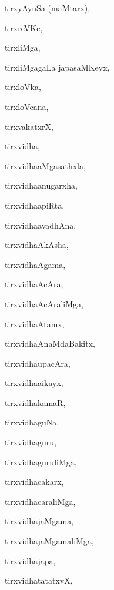 \begin{multicols}{2}
{tirxyAyuSa (maMtarx)}, \pageref{tirxyAyuSa maMtarx}

{tirxreVKe}, \pageref{tirxreVKe}

{tirxliMga}, \pageref{tirxliMga}

{tirxliMgagaLa japasaMKeyx}, \pageref{tirxliMgagaLa japasaMKeyx}

{tirxloVka}, \pageref{tirxloVka}

{tirxloVcana}, \pageref{tirxloVcana}

{tirxvakatxrX}, \pageref{tirxvakatxrX}

{tirxvidha}, \pageref{tirxvidha}

{tirxvi{dha}aMgasathxla}, \pageref{tirxvidhaaMgasathxla}

{tirxvi{dha}anugarxha}, \pageref{tirxvidhaanugarxha}

{tirxvi{dha}apiRta}, \pageref{tirxvidhaapiRta}

{tirxvi{dha}avadhAna}, \pageref{tirxvidhaavadhAna}

{tirxvi{dha}AkAsha}, \pageref{tirxvidhaAkAsha}

{tirxvi{dha}Agama}, \pageref{tirxvidhaAgama}

{tirxvi{dha}AcAra}, \pageref{tirxvidhaAcAra}

{tirxvi{dha}AcAraliMga}, \pageref{tirxvidhaAcAraliMga}

{tirxvi{dha}Atamx}, \pageref{tirxvidhaAtamx}

{tirxvi{dha}AnaMdaBakitx}, \pageref{tirxvidhaAnaMdaBakitx}

{tirxvi{dha}upacAra}, \pageref{tirxvidhaupacAra}

{tirxvi{dha}aikayx}, \pageref{tirxvidhaaikayx}

{tirxvidhakamaR}, \pageref{tirxvidhakamaR}

{tirxvidhaguNa}, \pageref{tirxvidhaguNa}

{tirxvidhaguru}, \pageref{tirxvidhaguru}

{tirxvidhaguruliMga}, \pageref{tirxvidhaguruliMga}

{tirxvidhacakarx}, \pageref{tirxvidhacakarx}

{tirxvidhacaraliMga}, \pageref{tirxvidhacaraliMga}

{tirxvidhajaMgama}, \pageref{tirxvidhajaMgama}

{tirxvidhajaMgamaliMga}, \pageref{tirxvidhajaMgamaliMga}

{tirxvidhajapa}, \pageref{tirxvidhajapa}

{tirxvidhatatatxvX}, \pageref{tirxvidhatatatxvX}


\end{multicols}
